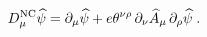 \begin{equation}
D^{\mbox{\scriptsize NC}}_\mu \widehat \psi = \partial_\mu \widehat \psi + 
e \theta^{\nu\rho} \, \partial_\nu\widehat A_\mu \, \partial_\rho \widehat \psi
\; .
\label{ncc1}	
\end{equation}

